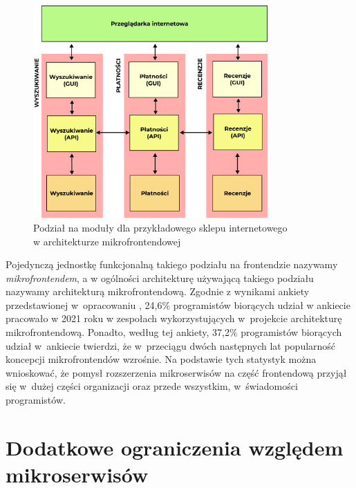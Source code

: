 \documentclass{SGGW-thesis}
\begin{document}
\begin{figure}[h]
	\centering
	\captionsetup{justification=centering}
	\includegraphics[width=0.8\textwidth]{microfrontends_diagram.png}
	\caption{Podział na moduły dla przykładowego sklepu internetowego \\ w architekturze mikrofrontendowej}
	\label{fig:microfrontends_diagram}
\end{figure}

Pojedynczą jednostkę funkcjonalną takiego podziału na frontendzie nazywamy \textit{mikrofrontendem}, a w ogólności architekturę używającą takiego podziału nazywamy architekturą mikrofrontendową.
Zgodnie z wynikami ankiety przedstawionej w~opracowaniu \cite{tsh_2022}, 24,6\% programistów biorących udział w ankiecie pracowało w 2021 roku w zespołach wykorzystujących w~projekcie architekturę mikrofrontendową. Ponadto, według tej ankiety, 37,2\% programistów biorących udział w~ankiecie twierdzi, że w~przeciągu dwóch następnych lat popularność koncepcji mikrofrontendów wzrośnie. Na podstawie tych statystyk można wnioskować, że pomysł rozszerzenia mikroserwisów na część frontendową przyjął się w~dużej części organizacji oraz przede wszystkim, w~świadomości programistów.

\section{Dodatkowe ograniczenia względem mikroserwisów}
\end{document}
